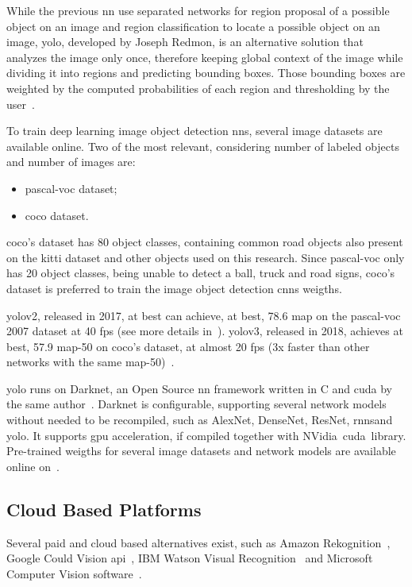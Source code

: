 While the previous \ac{nn} use separated networks for region proposal of a possible object on an image and region classification to locate a possible object on an image, \acf{yolo}, developed by Joseph Redmon, is an alternative solution that analyzes the image only once, therefore keeping global context of the image while dividing it into regions and predicting bounding boxes. Those bounding boxes are weighted by the computed probabilities of each region and thresholding by the user~\cite{Redmon2016}. 

To train deep learning image object detection \acp{nn}, several image datasets are available online. Two of the most relevant, considering number of labeled objects and number of images are:

\begin{itemize}
	\item \ac{pascal-voc} dataset;
	\item \ac{coco} dataset.
\end{itemize}

\ac{coco}'s dataset has 80 object classes, containing common road objects also present on the \ac{kitti} dataset and other objects used on this research\citeneeded. Since \ac{pascal-voc} only has 20 object classes\citeneeded, being unable to detect a ball, truck and road signs, \ac{coco}'s dataset is preferred to train the image object detection \acp{cnn} weigths.

\ac{yolo}v2, released in 2017, at best can achieve, at best, 78.6 \ac{map} on the \ac{pascal-voc} 2007 dataset at 40 \ac{fps} (see more details in~\cite{Redmon2017}). \ac{yolo}v3, released in 2018, achieves at best, 57.9 \ac{map}-50 on \ac{coco}'s dataset, at almost 20 \ac{fps} (3x faster than other networks with the same \ac{map}-50)~\cite{Redmon2018}.

\ac{yolo} runs on Darknet, an Open Source \ac{nn} framework written in C and \ac{cuda} by the same author~\cite{Redmon2013}. Darknet is configurable, supporting several network models without needed to be recompiled, such as AlexNet\citeneeded, DenseNet\citeneeded, ResNet\citeneeded, \acp{rnn}\citeneeded and \ac{yolo}\cite{Redmon2016}. It supports \ac{gpu} acceleration, if compiled together with NVidia\cp~\ac{cuda}\texttrademark~library. Pre-trained weigths for several image datasets and network models are available online on~\cite{Redmon2013}. 

\subsection{Cloud Based Platforms}
Several paid and cloud based alternatives exist, such as Amazon Rekognition~\cite{awsRekognition}, Google Could Vision \ac{api}~\cite{googlevision}, IBM Watson Visual Recognition~\cite{watson} and Microsoft Computer Vision software~\cite{azurecv}. 

